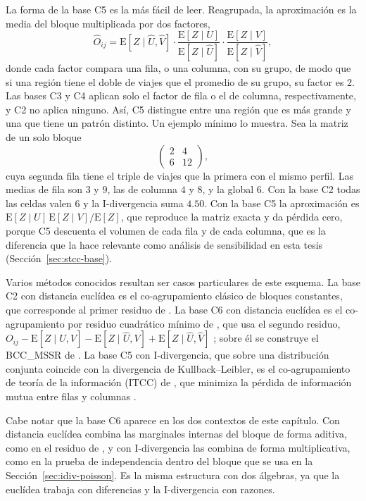 La forma de la base C5 es la más fácil de leer. Reagrupada, la aproximación es la
media del bloque multiplicada por dos factores,
\[
  \hat{O}_{ij} = \mathrm{E}[Z \mid \hat{U},\hat{V}] \cdot
  \frac{\mathrm{E}[Z \mid U]}{\mathrm{E}[Z \mid \hat{U}]} \cdot
  \frac{\mathrm{E}[Z \mid V]}{\mathrm{E}[Z \mid \hat{V}]},
\]
donde cada factor compara una fila, o una columna, con su grupo, de modo que si
una región tiene el doble de viajes que el promedio de su grupo, su factor es 2. Las bases C3
y C4 aplican solo el factor de fila o el de columna, respectivamente, y C2 no
aplica ninguno. Así, C5 distingue entre una región que es más grande y una que
tiene un patrón distinto. Un ejemplo mínimo lo muestra. Sea la matriz de un solo
bloque
\[
  \begin{pmatrix} 2 & 4 \\ 6 & 12 \end{pmatrix},
\]
cuya segunda fila tiene el triple de viajes que la primera con el mismo perfil.
Las medias de fila son $3$ y $9$, las de columna $4$ y $8$, y la global $6$. Con
la base C2 todas las celdas valen $6$ y la I-divergencia suma $4.50$. Con la base
C5 la aproximación es $\mathrm{E}[Z \mid U]\,\mathrm{E}[Z \mid V]/\mathrm{E}[Z]$, que
reproduce la matriz exacta y da pérdida cero, porque C5 descuenta el volumen de cada fila
y de cada columna, que es la diferencia que la hace relevante como análisis de
sensibilidad en esta tesis (Sección~\ref{sec:stcc-base}).

Varios métodos conocidos resultan ser casos particulares de este esquema. La base
C2 con distancia euclídea es el co-agrupamiento clásico de bloques constantes, que
corresponde al primer residuo de \citet{Cho2004}. La base C6 con distancia euclídea
es el co-agrupamiento por residuo cuadrático mínimo de \citet{Cho2004}, que usa el
segundo residuo, $O_{ij} - \mathrm{E}[Z \mid U,\hat{V}] - \mathrm{E}[Z \mid \hat{U},V] +
\mathrm{E}[Z \mid \hat{U},\hat{V}]$ \citep[Ejemplo~2.F]{Banerjee2007}; sobre él se
construye el BCC\_MSSR de \citet{Wu2022}. La base C5 con I-divergencia, que sobre
una distribución conjunta coincide con la divergencia de Kullback--Leibler, es el
co-agrupamiento de teoría de la información (ITCC) de \citet{Dhillon2003}, que
minimiza la pérdida de información mutua entre filas y columnas
\citep[Ejemplo~1.F]{Banerjee2007}.

Cabe notar que la base C6 aparece en los dos contextos de este capítulo. Con
distancia euclídea combina las marginales internas del bloque de forma aditiva,
como en el residuo de \citet{Cho2004}, y con I-divergencia las combina de forma
multiplicativa, como en la prueba de independencia dentro del bloque que se usa
en la Sección~\ref{sec:idiv-poisson}. Es la misma estructura con dos álgebras, ya que la
euclídea trabaja con diferencias y la I-divergencia con razones.


